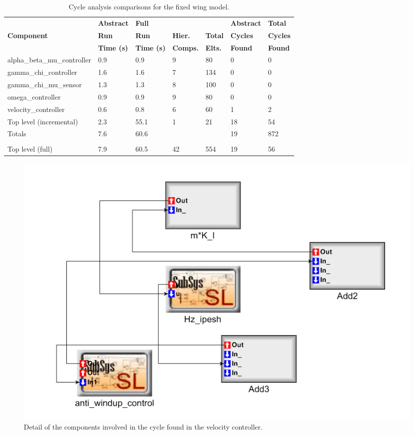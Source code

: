 \begin{table}[htb]
\centering
\begin{tabular}[width=\columnwidth]{ | l | l | l | l | l | l | l | }

\hline
              & \textbf{Abstract} & \textbf{Full} &                     &                          & \textbf{Abstract} & \textbf{Total} \\
\textbf{Component} & \textbf{Run} & \textbf{Run}  & \textbf{Hier.} & \textbf{Total} & \textbf{Cycles} & \textbf{Cycles} \\
              & \textbf{Time (s)} & \textbf{Time (s)} & \textbf{Comps.}  & \textbf{Elts.} & \textbf{Found} & \textbf{Found} \\
\hline \hline
alpha\_beta\_mu\_controller & 0.9 & 0.9 & 9 & 80 & 0 & 0 \\
\hline
gamma\_chi\_controller & 1.6 & 1.6 & 7 & 134 & 0 & 0 \\
\hline
gamma\_chi\_mu\_sensor & 1.3 & 1.3 & 8 & 100 & 0 & 0 \\
\hline
omega\_controller & 0.9 & 0.9 & 9 & 80 & 0 & 0 \\
\hline
velocity\_controller & 0.6 & 0.8 & 6 & 60 & 1 & 2 \\
\hline
Top level (incremental) & 2.3 & 55.1 & 1 & 21 & 18 & 54 \\
\hline
Totals & 7.6 & 60.6 & & & 19 & 872 \\
\hline
 & & & & & & \\
\hline
Top level (full) & 7.9 & 60.5 & 42 & 554 & 19 & 56 \\
\hline
\end{tabular}
\caption{Cycle analysis comparisons for the fixed wing model.}
\label{tab:cycletimes}
\end{table}

\begin{figure}[htb]	
    \begin{center}
    \centerline{\includegraphics[width=\columnwidth]{figures/velocity_cycle.png}}
    \caption{Detail of the components involved in the cycle found in the velocity controller.}
    \label{fig:velcyclemod}
    \end{center}	
\end{figure}

